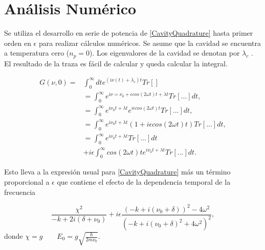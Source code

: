 \documentclass[10pt,a4paper]{report}
\begin{document}
\section{Análisis Numérico}

Se utiliza el desarrollo en serie de potencia de
\eqref{CavityQuadrature} hasta primer orden en $\epsilon$ para
realizar cálculos numéricos. Se asume que la cavidad se encuentra a
temperatura cero ($n_p=0$). Los eigenvalores de la cavidad se denotan
por $\lambda_c$ . El resultado de la traza es fácil de calcular y queda
calcular la integral. 


\begin{align}
G(\nu,0)=&\int_0^\infty dt e^{(i\nu(t)+\lambda_c) t}Tr[]\\
&= \int_0^\infty e^{i \nu = \nu_0 + \epsilon cos(2\omega t) t + \lambda t} Tr[...]dt, \\
&=\int_0^\infty e^{i \nu_0 t + \lambda t}e^{i \epsilon cos(2\omega t)t} Tr[...]dt, \\
&=\int_0^\infty e^{i \nu_0 t + \lambda t}(1+i \epsilon cos(2\omega t)t) Tr[...]dt, \\
&=\int_0^\infty e^{i \nu_0 t + \lambda t}Tr[...]dt\\
&+i\epsilon\int_0^\infty cos(2\omega t)t e^{i \nu_0 t + \lambda t}Tr[...]dt.
\end{align}




Esto lleva a la expresión usual para \ref{CavityQuadrature} más un
término proporcional a $\epsilon$ que contiene el efecto de la
dependencia temporal de la frecuencia

\begin{equation}
 \frac{\chi^2}{-k + 2i(\delta + \nu_0)} +i\epsilon\frac{(-k + i(\nu_0 + \delta))^2 - 4\omega^2}{(-k + i(\nu_0 + \delta)^2 + 4\omega^2)^2},
\end{equation} donde $\chi = g \qquad E_0 = g \sqrt{\frac{\hbar}{2m\nu_0}}$.
\end{document}
